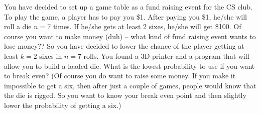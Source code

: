 You have decided to set up a game table 
as a fund raising event
for the CS club.
To play the game, a player has to pay you \$1.
After paying you \$1, he/she will roll a die $n=7$ times.
If he/she gets at least 2 sixes, he/she will get \$100.
Of course you want to make money (duh) -- what kind of fund raising event
wants to lose money??
So you have decided to lower the chance of the player
getting at least $k=2$ sixes in $n=7$ rolls.
You found a 3D printer and a program that will allow you to
build a loaded die.
What is the lowest
probability to use if you want to break even?
(Of course you do want to raise some money.
If you make it impossible to get a six, then after just a couple of
games, people would know that the die is rigged.
So you want to know your break even point and then slightly lower
the probability of getting a six.)

